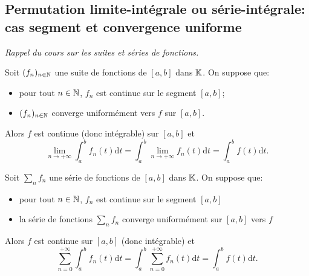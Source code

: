 \documentclass{book}
\begin{document}
\subsection{Permutation limite-intégrale ou série-intégrale: cas segment et convergence uniforme}
\textit{Rappel du cours sur les suites et séries de fonctions.}
\begin{Theoreme}
Soit $(f_n)_{n\in\mathbb{N}}$ une suite de fonctions de $[a,b]$ dans $\mathbb{K}$.
On suppose que:
\begin{itemize}
\item
  pour tout $n\in \mathbb{N} $, $f_n$ est continue sur le segment $[a,b]$;
\item
  $(f_n)_{n\in\mathbb{N}}$ converge uniformément vers $f$ sur $[a,b]$.
\end{itemize}

Alors $f$ est continue (donc intégrable) sur $[a,b]$ et
\[  \lim_{n\to +\infty} \int_a^b f_n(t)\mathrm dt = \int_a^b \lim_{n\to +\infty} f_n(t)\mathrm dt = \int_a^b f(t)\mathrm dt.  \]
\end{Theoreme}
\begin{Theoreme}
Soit $\sum_n f_n $ une série de fonctions de $[a,b]$ dans $\mathbb{K}$.
On suppose que:
\begin{itemize}
\item
  pour tout $n\in \mathbb{N} $, $f_n$ est continue sur le segment $[a,b]$
\item
  la série de fonctions $\sum_n f_n$ converge uniformément sur $[a,b]$ vers $f$
\end{itemize}
Alors $f$ est continue sur $[a,b]$ (donc intégrable) et
\[ \sum_{n=0}^{+\infty} \int_a^b f_n(t)\mathrm dt = \int_a^b \sum_{n=0}^{+\infty} f_n(t)\mathrm dt= \int_a^b f(t)\mathrm dt.   \]
\end{Theoreme}
\end{document}
